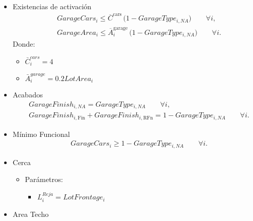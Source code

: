 \begin{itemize}
    \item {Existencias de activación}
\begin{align}
& GarageCars_i \le \overline{C}^{\text{cars}} \,\big(1 - GarageType_{i,NA}\big) \qquad \forall i,\\
& GarageArea_i \le \overline{A}^{\text{garage}}_i \,\big(1 - GarageType_{i,NA}\big) \qquad \forall i.
\end{align}
Donde:
    \begin{itemize}
        \item $\bar{C}_{i}^{cars}=4$
        \item $\bar{A}_{i}^{garage}=0.2 LotArea_{i}$
    \end{itemize}
    \item {Acabados}
\begin{align}
& GarageFinish_{i,NA} = GarageType_{i,NA} \qquad \forall i,\\
& GarageFinish_{i,\text{Fin}} + GarageFinish_{i,\text{RFn}} 
  = 1 - GarageType_{i,NA} \qquad \forall i.
\end{align}


    \item {Mínimo Funcional}
\begin{align}
& GarageCars_i \ge 1 - GarageType_{i,NA} \qquad \forall i.
\end{align}
    \item {Cerca}
\begin{itemize}
    \item Parámetros:
    \begin{itemize}
        \item $L^{Reja}_{i}=LotFrontage_{i}$
    \end{itemize}
\end{itemize}

    \item {Area Techo}



\end{itemize}
